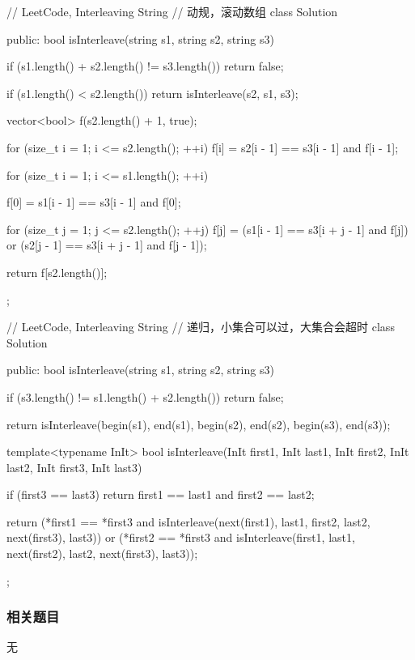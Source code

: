 \begin{Code}
// LeetCode, Interleaving String
// 动规，滚动数组
class Solution {
public:
    bool isInterleave(string s1, string s2, string s3) {
        if (s1.length() + s2.length() != s3.length())
            return false;

        if (s1.length() < s2.length())
            return isInterleave(s2, s1, s3);

        vector<bool> f(s2.length() + 1, true);

        for (size_t i = 1; i <= s2.length(); ++i)
            f[i] = s2[i - 1] == s3[i - 1] and f[i - 1];

        for (size_t i = 1; i <= s1.length(); ++i) {
            f[0] = s1[i - 1] == s3[i - 1] and f[0];

            for (size_t j = 1; j <= s2.length(); ++j)
                f[j] = (s1[i - 1] == s3[i + j - 1] and f[j])
                        or (s2[j - 1] == s3[i + j - 1] and f[j - 1]);
        }

        return f[s2.length()];
    }
};
\end{Code}

\begin{Code}
// LeetCode, Interleaving String
// 递归，小集合可以过，大集合会超时
class Solution {
public:
    bool isInterleave(string s1, string s2, string s3) {
        if (s3.length() != s1.length() + s2.length())
            return false;

        return isInterleave(begin(s1), end(s1), begin(s2), end(s2),
                begin(s3), end(s3));
    }

    template<typename InIt>
    bool isInterleave(InIt first1, InIt last1, InIt first2, InIt last2,
            InIt first3, InIt last3) {
        if (first3 == last3)
            return first1 == last1 and first2 == last2;

        return (*first1 == *first3
                and isInterleave(next(first1), last1, first2, last2,
                        next(first3), last3))
                or (*first2 == *first3
                        and isInterleave(first1, last1, next(first2), last2,
                                next(first3), last3));
    }
};
\end{Code}

\subsubsection{相关题目}
\begindot
\item 无
\myenddot


